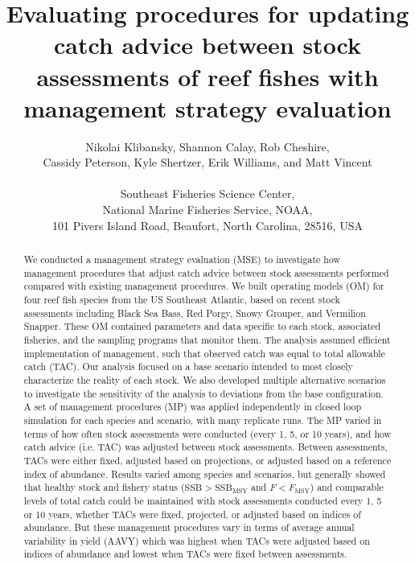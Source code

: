 \documentclass[12pt,english]{article}
\begin{document}









\title{Evaluating procedures for updating catch advice between stock assessments of reef fishes with management strategy evaluation}
\author{Nikolai Klibansky,  Shannon Calay, Rob Cheshire,\\
Cassidy Peterson, Kyle Shertzer, Erik Williams, and Matt Vincent\\\\
Southeast Fisheries Science Center, \\
National Marine Fisheries Service, NOAA,\\
101 Pivers Island Road, Beaufort, North Carolina, 28516, USA}
\maketitle

\begin{abstract}
We conducted a management strategy evaluation (MSE) to investigate how management procedures that adjust catch advice between stock assessments performed compared with existing management procedures. We built operating models (OM) for four reef fish species from the US Southeast Atlantic, based on recent stock assessments including Black Sea Bass, Red Porgy, Snowy Grouper, and Vermilion Snapper. These OM contained parameters and data specific to each stock, associated fisheries, and the sampling programs that monitor them. The analysis assumed efficient implementation of management, such that observed catch was equal to total allowable catch (TAC). Our analysis focused on a base scenario intended to most closely characterize the reality of each stock. We also developed multiple alternative scenarios to investigate the sensitivity of the analysis to deviations from the base configuration. A set of management procedures (MP) was applied independently in closed loop simulation for each species and scenario, with many replicate runs. The MP varied in terms of how often stock assessments were conducted (every 1, 5, or 10 years), and how catch advice (i.e. TAC) was adjusted between stock assessments. Between assessments, TACs were either fixed, adjusted based on projections, or adjusted based on a reference index of abundance. Results varied among species and scenarios, but generally showed that healthy stock and fishery status ($\mathrm{SSB>SSB_{MSY}}$ and $F<F_{\mathrm{MSY}}$) and comparable levels of total catch could be maintained with stock assessments conducted every 1, 5 or 10 years, whether TACs were fixed, projected, or adjusted based on indices of abundance. But these management procedures vary in terms of average annual variability in yield (AAVY) which was highest when TACs were adjusted based on indices of abundance and lowest when TACs were fixed between assessments.

\end{abstract}
\end{document}

